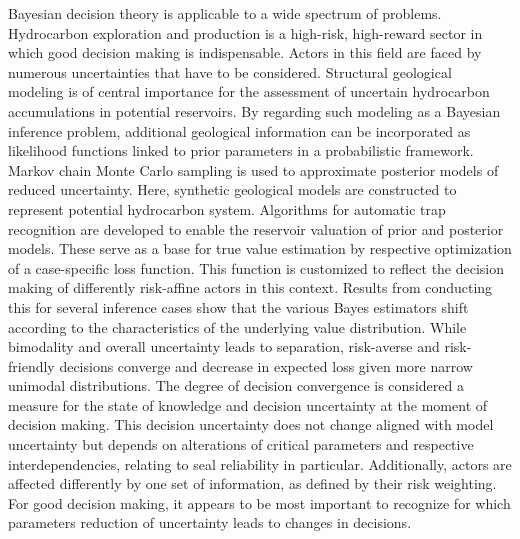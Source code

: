 \documentclass[a4paper,11pt]{MScThesis}
\begin{document}
\cleardoublepage



Bayesian decision theory is applicable to a wide spectrum of problems. Hydrocarbon exploration and production is a high-risk, high-reward sector in which good decision making is indispensable. Actors in this field are faced by numerous uncertainties that have to be considered. Structural geological modeling is of central importance for the assessment of uncertain hydrocarbon accumulations in potential reservoirs. By regarding such modeling as a Bayesian inference problem, additional geological information can be incorporated as likelihood functions linked to prior parameters in a probabilistic framework. Markov chain Monte Carlo sampling is used to approximate posterior models of reduced uncertainty. Here, synthetic geological models are constructed to represent potential hydrocarbon system. Algorithms for automatic trap recognition are developed to enable the reservoir valuation of prior and posterior models. These serve as a base for true value estimation by respective optimization of a case-specific loss function. This function is customized to reflect the decision making of differently risk-affine actors in this context. Results from conducting this for several inference cases show that the various Bayes estimators shift according to the characteristics of the underlying value distribution. While bimodality and overall uncertainty leads to separation, risk-averse and risk-friendly decisions converge and decrease in expected loss given more narrow unimodal distributions. The degree of decision convergence is considered a measure for the state of knowledge and decision uncertainty at the moment of decision making. This decision uncertainty does not change aligned with model uncertainty but depends on alterations of critical parameters and respective interdependencies, relating to seal reliability in particular. Additionally, actors are affected differently by one set of information, as defined by their risk weighting. For good decision making, it appears to be most important to recognize for which parameters reduction of uncertainty leads to changes in decisions.
\end{document}
